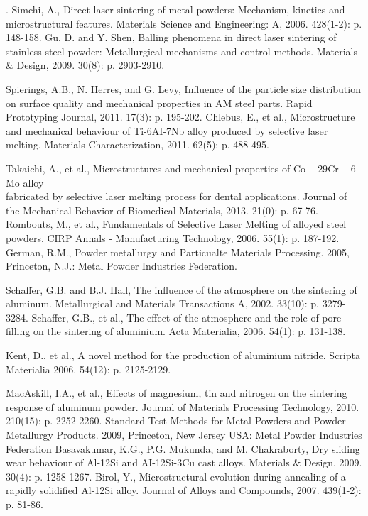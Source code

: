 \documentclass[10pt]{article}
\begin{document}
. Simchi, A., Direct laser sintering of metal powders: Mechanism, kinetics and microstructural features. Materials Science and Engineering: A, 2006. 428(1-2): p. 148-158. Gu, D. and Y. Shen, Balling phenomena in direct laser sintering of stainless steel powder: Metallurgical mechanisms and control methods. Materials \& Design, 2009. 30(8): p. 2903-2910.

Spierings, A.B., N. Herres, and G. Levy, Influence of the particle size distribution on surface quality and mechanical properties in AM steel parts. Rapid Prototyping Journal, 2011. 17(3): p. 195-202. Chlebus, E., et al., Microstructure and mechanical behaviour of Ti-6AI-7Nb alloy produced by selective laser melting. Materials Characterization, 2011. 62(5): p. 488-495.

Takaichi, A., et al., Microstructures and mechanical properties of $\mathrm{Co}-29 \mathrm{Cr}-6$ Mo alloy\\
fabricated by selective laser melting process for dental applications. Journal of the Mechanical Behavior of Biomedical Materials, 2013. 21(0): p. 67-76. Rombouts, M., et al., Fundamentals of Selective Laser Melting of alloyed steel powders. CIRP Annals - Manufacturing Technology, 2006. 55(1): p. 187-192. German, R.M., Powder metallurgy and Particualte Materials Processing. 2005, Princeton, N.J.: Metal Powder Industries Federation.

Schaffer, G.B. and B.J. Hall, The influence of the atmosphere on the sintering of aluminum. Metallurgical and Materials Transactions A, 2002. 33(10): p. 3279-3284. Schaffer, G.B., et al., The effect of the atmosphere and the role of pore filling on the sintering of aluminium. Acta Materialia, 2006. 54(1): p. 131-138.

Kent, D., et al., A novel method for the production of aluminium nitride. Scripta Materialia 2006. 54(12): p. 2125-2129.

MacAskill, I.A., et al., Effects of magnesium, tin and nitrogen on the sintering response of aluminum powder. Journal of Materials Processing Technology, 2010. 210(15): p. 2252-2260. Standard Test Methods for Metal Powders and Powder Metallurgy Products. 2009, Princeton, New Jersey USA: Metal Powder Industries Federation Basavakumar, K.G., P.G. Mukunda, and M. Chakraborty, Dry sliding wear behaviour of Al-12Si and AI-12Si-3Cu cast alloys. Materials \& Design, 2009. 30(4): p. 1258-1267. Birol, Y., Microstructural evolution during annealing of a rapidly solidified Al-12Si alloy. Journal of Alloys and Compounds, 2007. 439(1-2): p. 81-86.
\end{document}
